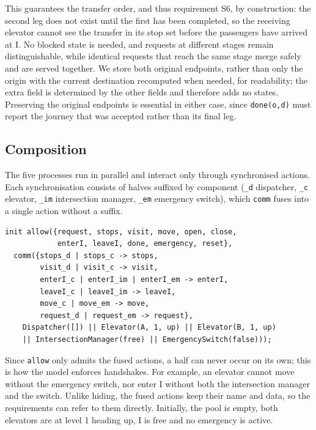 This guarantees the transfer order, and thus requirement S6, by construction: the second leg does not exist until the first has been completed, so the receiving elevator cannot see the transfer in its stop set before the passengers have arrived at I. No blocked state is needed, and requests at different stages remain distinguishable, while identical requests that reach the same stage merge safely and are served together. We store both original endpoints, rather than only the origin with the current destination recomputed when needed, for readability; the extra field is determined by the other fields and therefore adds no states. Preserving the original endpoints is essential in either case, since \texttt{done(o,d)} must report the journey that was accepted rather than its final leg.


\subsection{Composition}
\label{subsec:composition}

The five processes run in parallel and interact only through synchronised actions. Each synchronisation consists of halves suffixed by component (\texttt{\_d} dispatcher, \texttt{\_c} elevator, \texttt{\_im} intersection manager, \texttt{\_em} emergency switch), which \texttt{comm} fuses into a single action without a suffix.

\begin{lstlisting}
init allow({request, stops, visit, move, open, close,
            enterI, leaveI, done, emergency, reset},
  comm({stops_d | stops_c -> stops,
        visit_d | visit_c -> visit,
        enterI_c | enterI_im | enterI_em -> enterI,
        leaveI_c | leaveI_im -> leaveI,
        move_c | move_em -> move,
        request_d | request_em -> request},
    Dispatcher([]) || Elevator(A, 1, up) || Elevator(B, 1, up)
    || IntersectionManager(free) || EmergencySwitch(false)));
\end{lstlisting}

Since \texttt{allow} only admits the fused actions, a half can never occur on its own; this is how the model enforces handshakes. For example, an elevator cannot move without the emergency switch, nor enter I without both the intersection manager and the switch. Unlike hiding, the fused actions keep their name and data, so the requirements can refer to them directly. Initially, the pool is empty, both elevators are at level 1 heading up, I is free and no emergency is active.


